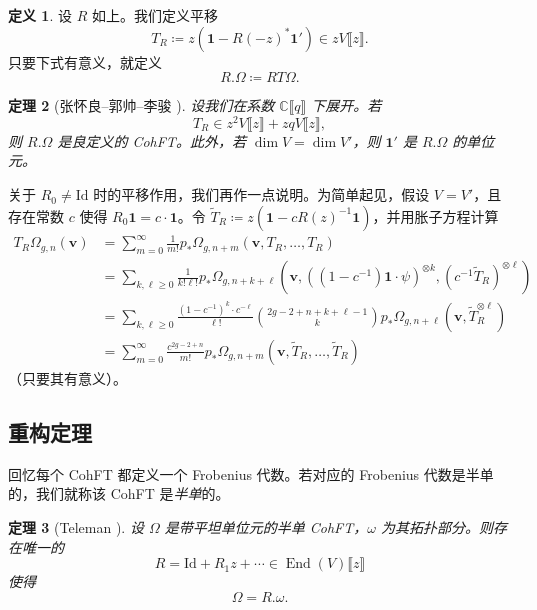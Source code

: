 \documentclass{amsart}
\newtheorem{thm}{定理}[section]
\theoremstyle{definition}
\newtheorem{defn}[thm]{定义}
\theoremstyle{remark}
\theoremstyle{plain}
\theoremstyle{definition}
\theoremstyle{remark}
\newcommand{\C}{\mathbb{C}}
\newcommand{\mbf}[1]{\mathbf{#1}}
\newcommand{\bv}{\mbf{v}}
\newcommand{\mr}[1]{\mathrm{#1}}
\newcommand{\1}{\mathbf{1}}
\newcommand{\2}{\mathbf{2}}
\newcommand{\3}{\mathbf{3}}
\newcommand{\ps}[1]{\llbracket #1 \rrbracket}
\DeclareMathOperator{\End}{End}
\begin{document}
\begin{defn}
    设 $R$ 如上。我们定义平移
    \[ T_R \coloneqq z (\1 - R(-z)^* \1') \in z V\ps{z}. \]
    只要下式有意义，就定义
    \[ R.\Omega \coloneqq RT\Omega. \]
\end{defn}

\begin{thm}[张怀良–郭帅–李骏 {\cite[定理~2.7]{CGL2026}}]
    设我们在系数 $\C\ps{q}$ 下展开。若
    \[ T_R \in z^2 V \ps{z} + zq V \ps{z}, \]
    则 $R.\Omega$ 是良定义的 CohFT。此外，若 $\dim V = \dim V'$，则 $\1'$ 是 $R.\Omega$ 的单位元。
\end{thm}

关于 $R_0 \neq \mr{Id}$ 时的平移作用，我们再作一点说明。为简单起见，假设 $V = V'$，且存在常数 $c$ 使得 $R_0 \1 = c \cdot \1$。令 $\tilde{T}_R \coloneqq z( \1 - c R(z)^{-1} \1)$，并用胀子方程计算
\begin{align*}
    T_R \Omega_{g,n}(\bv) &= \sum_{m=0}^{\infty} \frac{1}{m!} p_*\Omega_{g,n+m}(\bv, T_R, \ldots, T_R) \\
    &= \sum_{k,\ell \geq 0} \frac{1}{k!\ell!} p_* \Omega_{g,n+k+\ell}(\bv, ( (1-c^{-1})\1 \cdot \psi )^{\otimes k}, ( c^{-1} \tilde{T}_R )^{\otimes \ell}) \\
    &= \sum_{k,\ell \geq 0} \frac{(1-c^{-1})^k \cdot c^{-\ell}}{\ell!} \binom{2g-2+n+k+\ell-1}{k} p_* \Omega_{g,n+\ell}(\bv, \tilde{T}_R^{\otimes \ell}) \\
    &= \sum_{m=0}^{\infty} \frac{c^{2g-2+n}}{m!} p_* \Omega_{g,n+m}(\bv, \tilde{T}_R, \ldots, \tilde{T}_R)
\end{align*}
（只要其有意义）。


\subsection{重构定理}%
\label{sub:Reconstruction theorem}

回忆每个 CohFT 都定义一个 Frobenius 代数。若对应的 Frobenius 代数是半单的，我们就称该 CohFT 是\textit{半单}的。

\begin{thm}[Teleman {\cite{Teleman2012}}]%
\label{thm:teleman}
    设 $\Omega$ 是带平坦单位元的半单 CohFT，$\omega$ 为其拓扑部分。则存在唯一的
    \[ R = \mr{Id} + R_1 z + \cdots \in \End(V)\ps{z} \]
    使得
    \[ \Omega = R.\omega. \]
\end{thm}
\end{document}
